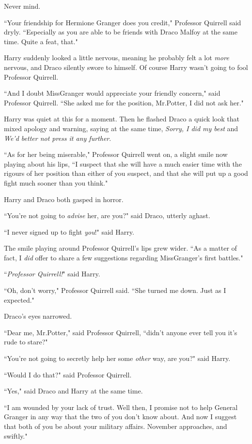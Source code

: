 Never mind.

``Your friendship for Hermione Granger does you credit," Professor Quirrell said dryly. ``Especially as you are able to be friends with Draco Malfoy at the same time. Quite a feat, that."

Harry suddenly looked a little nervous, meaning he probably felt a lot \emph{more} nervous, and Draco silently swore to himself. Of course Harry wasn't going to fool Professor Quirrell.

``And I doubt Miss\?Granger would appreciate your friendly concern," said Professor Quirrell. ``She asked me for the position, Mr.\?Potter, I did not ask her."

Harry was quiet at this for a moment. Then he flashed Draco a quick look that mixed apology and warning, saying at the same time, \emph{Sorry, I did my best} and \emph{We'd better not press it any further}.

``As for her being miserable," Professor Quirrell went on, a slight smile now playing about his lips, ``I suspect that she will have a much easier time with the rigours of her position than either of you suspect, and that she will put up a good fight much sooner than you think."

Harry and Draco both gasped in horror.

``You're not going to \emph{advise} her, are you?" said Draco, utterly aghast.

``I never signed up to fight \emph{you}!" said Harry.

The smile playing around Professor Quirrell's lips grew wider. ``As a matter of fact, I \emph{did} offer to share a few suggestions regarding Miss\?Granger's first battles."

``\emph{Professor Quirrell!}" said Harry.

``Oh, don't worry," Professor Quirrell said. ``She turned me down. Just as I expected."

Draco's eyes narrowed.

``Dear me, Mr.\?Potter," said Professor Quirrell, ``didn't anyone ever tell you it's rude to stare?"

``You're not going to secretly help her some \emph{other} way, are you?" said Harry.

``Would I do that?" said Professor Quirrell.

``Yes," said Draco and Harry at the same time.

``I am wounded by your lack of trust. Well then, I promise not to help General Granger in any way that the two of you don't know about. And now I suggest that both of you be about your military affairs. November approaches, and swiftly."

